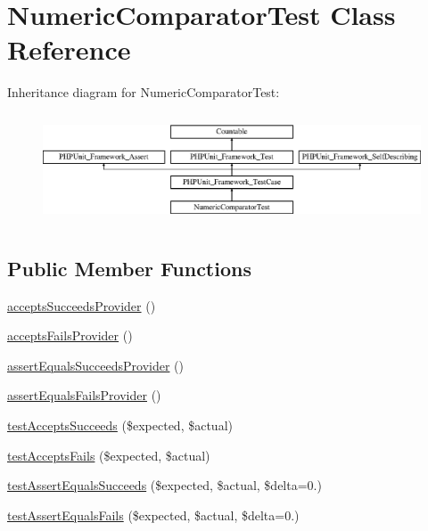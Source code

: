 \hypertarget{class_sebastian_bergmann_1_1_comparator_1_1_numeric_comparator_test}{}\section{Numeric\+Comparator\+Test Class Reference}
\label{class_sebastian_bergmann_1_1_comparator_1_1_numeric_comparator_test}
Inheritance diagram for Numeric\+Comparator\+Test\+:\begin{figure}[H]
\begin{center}
\leavevmode
\includegraphics[height=3.303835cm]{class_sebastian_bergmann_1_1_comparator_1_1_numeric_comparator_test}
\end{center}
\end{figure}
\subsection*{Public Member Functions}
\begin{DoxyCompactItemize}
\item 
\mbox{\hyperlink{class_sebastian_bergmann_1_1_comparator_1_1_numeric_comparator_test_a2ca71e8095ac10e058cd9d7a68da8608}{accepts\+Succeeds\+Provider}} ()
\item 
\mbox{\hyperlink{class_sebastian_bergmann_1_1_comparator_1_1_numeric_comparator_test_a9ea19e26cacbca06356c2f229079f8a1}{accepts\+Fails\+Provider}} ()
\item 
\mbox{\hyperlink{class_sebastian_bergmann_1_1_comparator_1_1_numeric_comparator_test_acb6bc1b6e9d32990bdd287f8b590a5fa}{assert\+Equals\+Succeeds\+Provider}} ()
\item 
\mbox{\hyperlink{class_sebastian_bergmann_1_1_comparator_1_1_numeric_comparator_test_a3cc10e39239b6e3f3fda1d34c0fb1c14}{assert\+Equals\+Fails\+Provider}} ()
\item 
\mbox{\hyperlink{class_sebastian_bergmann_1_1_comparator_1_1_numeric_comparator_test_a907ea73398b22f4a8cf37728cfc981e3}{test\+Accepts\+Succeeds}} (\$expected, \$actual)
\item 
\mbox{\hyperlink{class_sebastian_bergmann_1_1_comparator_1_1_numeric_comparator_test_afe5eff1a1b7049f973a035117a7e0df1}{test\+Accepts\+Fails}} (\$expected, \$actual)
\item 
\mbox{\hyperlink{class_sebastian_bergmann_1_1_comparator_1_1_numeric_comparator_test_aad90dcf32f0451135282025c43fb9661}{test\+Assert\+Equals\+Succeeds}} (\$expected, \$actual, \$delta=0.)
\item 
\mbox{\hyperlink{class_sebastian_bergmann_1_1_comparator_1_1_numeric_comparator_test_a8efcbbd3edf65fab391544da6525c167}{test\+Assert\+Equals\+Fails}} (\$expected, \$actual, \$delta=0.)
\end{DoxyCompactItemize}
